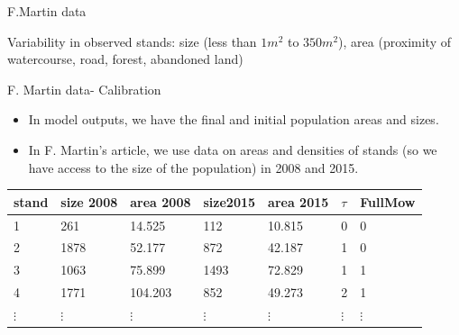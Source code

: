 \documentclass{myBeamer}
\begin{document}
\begin{frame}{F.Martin data}
\begin{minipage}{0.45\linewidth}

\bigbreak
Variability in observed stands: size (less than $1m^2$ to $350 m^2$), area (proximity of watercourse, road, forest, abandoned land)

\end{minipage}
\end{frame}




\begin{frame}{F. Martin data- Calibration}
\begin{itemize}
\item In model outputs, we have the final and initial population areas and sizes.
\item In F. Martin's article, we use data on areas and densities of stands (so we have access to the size of the population) in 2008 and 2015.
\end{itemize}

\bigbreak

	 \footnotesize
\begin{tabular}{lllllll}
	\hline
   stand   &   size 2008   & area 2008   &   size2015  & area 2015  & $\tau$ & FullMow  \\  
   	\hline
    1 &  261  &  14.525     &  112   &      10.815    &  0   &   0   \\
    2 & 1878  &  52.177     &   872  &			42.187  &  1   &   0   \\
    3 & 1063  &  75.899 	 &  1493   &	  72.829    &  1 	&  1   \\
    4 & 1771  &  104.203    &  852   &      49.273    &  2   &  1   \\
 $\vdots$ &   $\vdots$ & $\vdots$ &  $\vdots$ &  $\vdots$  &   $\vdots$ &  $\vdots$ \\    
     \hline
\end{tabular}
\end{frame}


\end{document}
